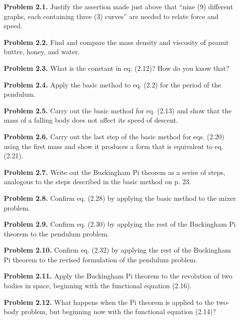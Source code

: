 \begin{enumerate}
    \item[\textbf{Problem 2.1.}] Justify the assertion made just above that ``nine (9) different graphs, each containing three (3) curves'' are needed to relate force and speed.

    \item[\textbf{Problem 2.2.}] Find and compare the mass density and viscosity of peanut butter, honey, and water.

    \item[\textbf{Problem 2.3.}] What is the constant in eq. (2.12)? How do you know that?

    \item[\textbf{Problem 2.4.}] Apply the basic method to eq. (2.2) for the period of the pendulum.

    \item[\textbf{Problem 2.5.}] Carry out the basic method for eq. (2.13) and show that the mass of a falling body does not affect its speed of descent.

    \item[\textbf{Problem 2.6.}] Carry out the last step of the basic method for eqs. (2.20) using the first mass and show it produces a form that is equivalent to eq. (2.21).

    \item[\textbf{Problem 2.7.}] Write out the Buckingham Pi theorem as a series of steps, analogous to the steps described in the basic method on p. 23.

    \item[\textbf{Problem 2.8.}] Confirm eq. (2.28) by applying the basic method to the mixer problem.

    \item[\textbf{Problem 2.9.}] Confirm eq. (2.30) by applying the rest of the Buckingham Pi theorem to the pendulum problem.

    \item[\textbf{Problem 2.10.}] Confirm eq. (2.32) by applying the rest of the Buckingham Pi theorem to the revised formulation of the pendulum problem.

    \item[\textbf{Problem 2.11.}] Apply the Buckingham Pi theorem to the revolution of two bodies in space, beginning with the functional equation (2.16).

    \item[\textbf{Problem 2.12.}] What happens when the Pi theorem is applied to the two-body problem, but beginning now with the functional equation (2.14)?


\end{enumerate}

